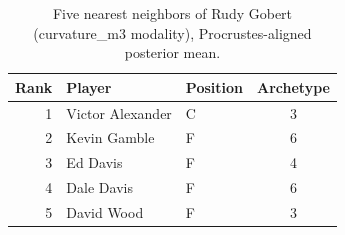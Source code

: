 \begin{table}[htbp]
  \centering\small
  \begin{tabular}{rllc}
    \toprule
    Rank & Player & Position & Archetype \\
    \midrule
    1 & Victor Alexander & C & 3 \\
    2 & Kevin Gamble & F & 6 \\
    3 & Ed Davis & F & 4 \\
    4 & Dale Davis & F & 6 \\
    5 & David Wood & F & 3 \\
    \bottomrule
  \end{tabular}
  \caption{Five nearest neighbors of Rudy Gobert (curvature_m3 modality), Procrustes-aligned posterior mean.}
  \label{tab:Rudy_Gobert_neighbors_curvature_m3}
\end{table}

